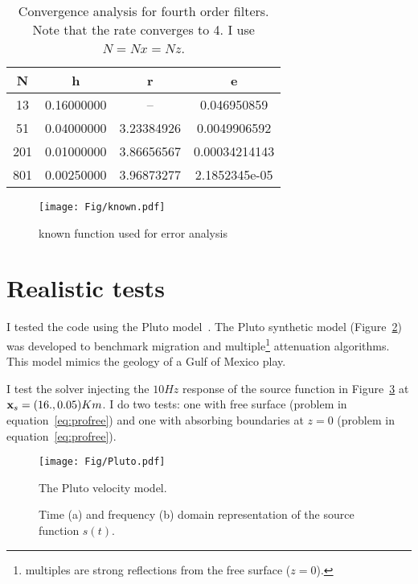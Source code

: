 \documentclass[10pt]{article}
\begin{document}
\begin{table}
\centering
  \begin{tabular}{c c c c}
  N&     h     &     r     &     e        \\ \hline
 13& 0.16000000& --        & 0.046950859  \\ 
 51& 0.04000000& 3.23384926& 0.0049906592 \\
201& 0.01000000& 3.86656567& 0.00034214143\\
801& 0.00250000& 3.96873277& 2.1852345e-05
  \end{tabular}
\caption{Convergence analysis for fourth order filters. Note that the rate converges to 4. I use $N=Nx=Nz$.}
\label{tab:rate4}
\end{table}

\begin{figure}
\centering
\texttt{[image: Fig/known.pdf]}
\caption{known function used for error analysis}
\label{fig:known}
\end{figure}


\section{Realistic tests}
I tested the code using the Pluto model~\cite{Pluto}. The Pluto synthetic model (Figure~\ref{fig:Pluto}) was developed to
benchmark migration and multiple\footnote{multiples are strong reflections from the free surface ($z=0$).} 
attenuation algorithms. This model mimics the geology of a Gulf of Mexico play.  

I test the solver injecting the $10Hz$ response of the source function in Figure~\ref{fig:source} at ${\bf x}_s = ( 16.,  0.05)Km$.
I do two tests: one with free surface (problem in equation~\ref{eq:profree}) and one with absorbing boundaries at $z=0$ (problem in 
equation~\ref{eq:profree}).

\begin{figure}
\texttt{[image: Fig/Pluto.pdf]}
\caption{The Pluto velocity model.}
\label{fig:Pluto}
\end{figure}


\begin{figure}
\centering
{}
\caption{Time (a) and frequency (b) domain representation of the source function $s(t)$.}
\label{fig:source}
\end{figure}
\end{document}
